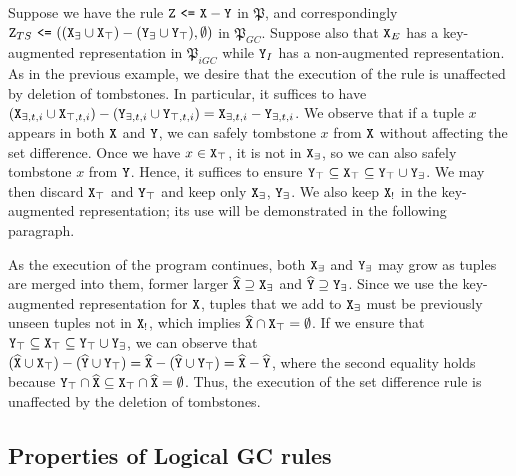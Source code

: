 \begin{example}
Suppose we have the rule $\tt{Z} ~\tt{<=}~ \tt{X} - \tt{Y}$ in $\mathfrak{P}$, and correspondingly $\tt{Z}_{TS} ~\tt{<=}~ ((\tt{X}_\exists \cup \tt{X}_\top) - (\tt{Y}_\exists \cup \tt{Y}_\top), \emptyset)$ in $\mathfrak{P}_{GC}$.
Suppose also that $\tt{X}_E$ has a key-augmented representation in $\mathfrak{P}_{iGC}$ while $\tt{Y}_I$ has a non-augmented representation.
As in the previous example, we desire that the execution of the rule is unaffected by deletion of tombstones.
In particular, it suffices to have
$(\tt{X}_{\exists,t,i} \cup \tt{X}_{\top,t,i}) - (\tt{Y}_{\exists,t,i} \cup \tt{Y}_{\top,t,i}) = \tt{X}_{\exists,t,i} - \tt{Y}_{\exists,t,i}$.
We observe that if a tuple $x$ appears in both $\tt{X}$ and $\tt{Y}$, we can safely tombstone $x$ from $\tt{X}$ without affecting the set difference.
Once we have $x \in \tt{X}_\top$, it is not in $\tt{X}_\exists$, so we can also safely tombstone $x$ from $\tt{Y}$.
Hence, it suffices to ensure $\tt{Y}_\top \subseteq \tt{X}_\top \subseteq \tt{Y}_\top \cup \tt{Y}_\exists$.
We may then discard $\tt{X}_\top$ and $\tt{Y}_\top$ and keep only $\tt{X}_\exists$, $\tt{Y}_\exists$.
We also keep $\tt{X}_!$ in the key-augmented representation; its use will be demonstrated in the following paragraph.

As the execution of the program continues, both $\tt{X}_\exists$ and $\tt{Y}_\exists$ may grow as tuples are merged into them, former larger $\widehat{\tt{X}} \supseteq \tt{X}_\exists$ and $\widehat{\tt{Y}} \supseteq \tt{Y}_\exists$.
Since we use the key-augmented representation for $\tt{X}$, tuples that we add to $\tt{X}_\exists$ must be previously unseen tuples not in $\tt{X}_!$, which implies $\widehat{\tt{X}} \cap \tt{X}_\top = \emptyset$.
If we ensure that $\tt{Y}_\top \subseteq \tt{X}_\top \subseteq \tt{Y}_\top \cup \tt{Y}_\exists$, we can observe that
$
(\widehat{\tt{X}} \cup \tt{X}_\top) - (\widehat{\tt{Y}} \cup \tt{Y}_\top)
= \widehat{\tt{X}} - (\widehat{\tt{Y}} \cup \tt{Y}_\top)
= \widehat{\tt{X}} - \widehat{\tt{Y}}
$,
where the second equality holds because $\tt{Y}_\top \cap \widehat{\tt{X}} \subseteq \tt{X}_\top \cap \widehat{\tt{X}} = \emptyset$.
Thus, the execution of the set difference rule is unaffected by the deletion of tombstones.
\end{example}


\subsection{Properties of Logical GC rules}


